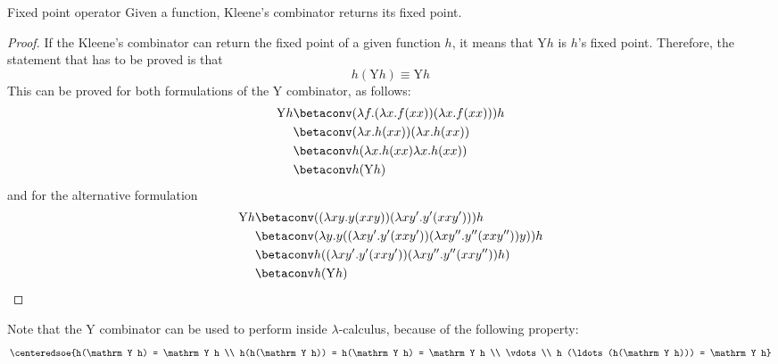 \documentclass[a4paper, 12pt]{report}
\begin{document}
    \begin{framedprop}{Fixed point operator}
        Given a function, Kleene's combinator returns its fixed point.
    \end{framedprop}

    \begin{proof}
        If the Kleene's combinator can return the fixed point of a given function $h$, it means that $\mathrm Y h$ is $h$'s fixed point. Therefore, the statement that has to be proved is that $$h (\mathrm Y h) \equiv \mathrm Y h$$ This can be proved for both formulations of the $\mathrm Y$ combinator, as follows:
        \begin{equation*}
            \begin{split}
                \mathrm Y h &\betaconv (\lambda f .(\lambda x.f(xx)) (\lambda x.f(xx))) h \\
                            &\betaconv (\lambda x.h(xx))(\lambda x.h(xx)) \\
                            &\betaconv h(\lambda x.h(xx) \lambda x. h(xx)) \\
                            &\betaconv h (\mathrm Y h)
            \end{split}
        \end{equation*}
        and for the alternative formulation
        \begin{equation*}
            \begin{split}
                \mathrm Y h &\betaconv ((\lambda xy.y(xxy))(\lambda xy'.y'(xxy')))h \\
                            &\betaconv (\lambda y.y ((\lambda xy'.y'(xxy'))(\lambda xy''.y''(xxy''))y))h \\
                            &\betaconv h ((\lambda xy'.y'(xxy'))(\lambda xy''.y''(xxy''))h) \\
                            &\betaconv h(\mathrm Y h)
            \end{split}
        \end{equation*}
    \end{proof}

    Note that the $\mathrm Y$ combinator can be used to perform  inside $\lambda$-calculus, because of the following property: $$\centeredsoe{h(\mathrm Y h) = \mathrm Y h \\ h(h(\mathrm Y h)) = h(\mathrm Y h) = \mathrm Y h \\ \vdots \\ h (\ldots (h(\mathrm Y h))) = \mathrm Y h}$$
\end{document}
